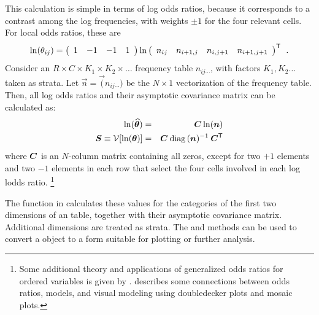 \documentclass[10pt,krantz2]{krantz}\usepackage[]{graphicx}\usepackage[]{color}
\begin{document}
This calculation is simple in terms of log odds ratios, because it corresponds to a contrast among the log frequencies,
with weights $\pm 1$ for the four relevant cells. For local odds ratios, these are
\begin{equation*}
 \ln( \theta_{ij}) = 
  \left(\begin{array}{rrrr}
  1  & -1 &  -1 & 1
  \end{array}
  \right)
  \ln
	\left(\begin{array}{rrrr}
  n_{ij}  & n_{i+1, j} &  n_{i,j+1} & n_{i+1, j+1}
  \end{array}
  \right)^\mathsf{T} \:\: .
\end{equation*}
Consider an $R \times C \times K_1 \times K_2 \times \dots$ frequency table $n_{ij\cdots}$, with factors
$K_1, K_2 \dots$  taken as strata. Let $\vec{n} = \Vec({n_{ij\cdots}})$ be the $N\times 1$ vectorization
of the frequency table. Then, all log odds ratios and their asymptotic covariance matrix can be calculated as:
\begin{eqnarray*}
\ln (\widehat{\bm{\theta}}) & = & \bm{C} \ln(\bm{n}) \\
\bm{S}  \equiv  \mathcal{V} [\ln (\bm{\theta})] & = & \bm{C} \: \mathrm{diag}\, (\bm{n})^{-1} \: \bm{C}^\mathsf{T}
\end{eqnarray*}
where $\bm{C}$ is an $N$-column matrix containing all zeros, except for 
two $+1$ elements and two $-1$ elements in each row that select the four cells involved in each log lodds ratio.%
\footnote{Some additional theory and applications of generalized odds ratios for ordered variables is given by \citet{Goodman:83}.
\citet{Hofmann:2001} describes some connections between odds ratios, \loglin models, and visual modeling using
doubledecker plots and mosaic plots.
}

The function  in  calculates these values for the categories of the first two
dimensions of an \nway table, together with their asymptotic covariance matrix. Additional dimensions are treated as strata.
The  and  methods can be used to convert a 
 object to a form suitable for plotting or further analysis.
\end{document}
